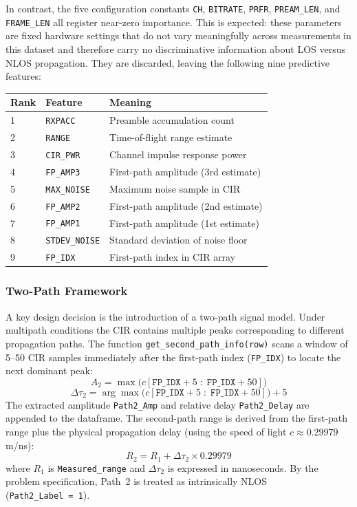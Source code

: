 \documentclass[conference]{IEEEtran}
\begin{document}
In contrast, the five configuration constants \texttt{CH}, \texttt{BITRATE},
\texttt{PRFR}, \texttt{PREAM\_LEN}, and \texttt{FRAME\_LEN} all register
near-zero importance. This is expected: these parameters are fixed hardware
settings that do not vary meaningfully across measurements in this dataset and
therefore carry no discriminative information about LOS versus NLOS propagation.
They are discarded, leaving the following nine predictive features:

\begin{center}
\small
\begin{tabular}{lll}
\toprule
\textbf{Rank} & \textbf{Feature} & \textbf{Meaning} \\
\midrule
1 & \texttt{RXPACC}       & Preamble accumulation count \\
2 & \texttt{RANGE}        & Time-of-flight range estimate \\
3 & \texttt{CIR\_PWR}    & Channel impulse response power \\
4 & \texttt{FP\_AMP3}    & First-path amplitude (3rd estimate) \\
5 & \texttt{MAX\_NOISE}  & Maximum noise sample in CIR \\
6 & \texttt{FP\_AMP2}    & First-path amplitude (2nd estimate) \\
7 & \texttt{FP\_AMP1}    & First-path amplitude (1st estimate) \\
8 & \texttt{STDEV\_NOISE}& Standard deviation of noise floor \\
9 & \texttt{FP\_IDX}     & First-path index in CIR array \\
\bottomrule
\end{tabular}
\end{center}

\subsubsection{Two-Path Framework}
A key design decision is the introduction of a two-path signal model. Under multipath
conditions the CIR contains multiple peaks corresponding to different propagation paths.
The function \texttt{get\_second\_path\_info(row)} scans a window of 5--50 CIR samples
immediately after the first-path index (\texttt{FP\_IDX}) to locate the next dominant
peak:
\begin{equation}
  A_2 = \max\bigl(c[\texttt{FP\_IDX}+5 \;:\; \texttt{FP\_IDX}+50]\bigr)
\end{equation}
\begin{equation}
  \Delta\tau_2 = \arg\max\bigl(c[\texttt{FP\_IDX}+5 \;:\; \texttt{FP\_IDX}+50]\bigr) + 5
\end{equation}
The extracted amplitude \texttt{Path2\_Amp} and relative delay \texttt{Path2\_Delay}
are appended to the dataframe. The second-path range is derived from the first-path
range plus the physical propagation delay (using the speed of light
$c \approx 0.29979$\,m/ns):
\begin{equation}
  R_2 = R_1 + \Delta\tau_2 \times 0.29979
\end{equation}
where $R_1$ is \texttt{Measured\_range} and $\Delta\tau_2$ is expressed in nanoseconds.
By the problem specification, Path~2 is treated as intrinsically NLOS (\texttt{Path2\_Label~=~1}).
\end{document}
